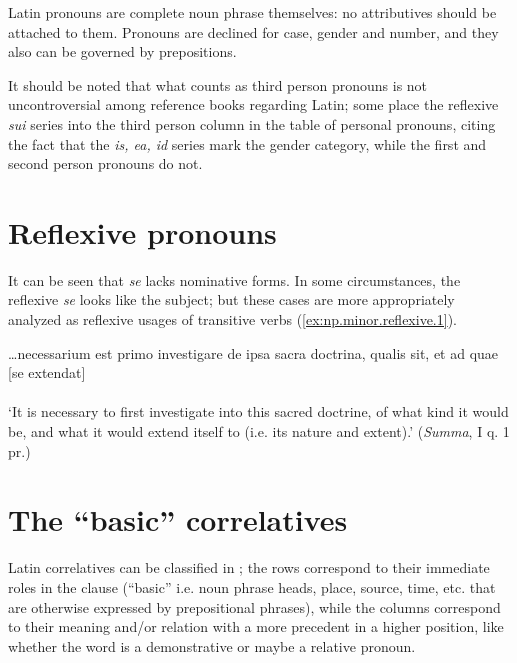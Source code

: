 \documentclass[a4paper, oneside, 12pt]{report}
\newcommand{\form}[1]{\emph{#1}}
\newcommand{\translate}[1]{`#1'}
\newcommand{\literature}[1]{\textit{#1}}
\begin{document}
Latin pronouns are complete noun phrase themselves:
no attributives should be attached to them. 
Pronouns are declined for case, gender and number,
and they also can be governed by prepositions.

It should be noted that what counts as third person pronouns 
is not uncontroversial among reference books regarding Latin; 
some place the reflexive \form{sui} series into the third person column 
in the table of personal pronouns, 
citing the fact that the \form{is, ea, id} series mark the gender category, 
while the first and second person pronouns do not.


\section{Reflexive pronouns}

It can be seen that \form{se} lacks nominative forms.
In some circumstances, 
the reflexive \form{se} looks like the subject;
but these cases are more appropriately analyzed 
as reflexive usages of transitive verbs
(\ref{ex:np.minor.reflexive.1}).

\begin{exe}
    \ex\label{ex:np.minor.reflexive.1} \gll \dots necessarium est primo investigare de ipsa sacra doctrina, 
    qualis sit, et ad quae [se extendat]  \\
    \\
    \glt \translate{It is necessary to first investigate into this sacred doctrine, 
    of what kind it would be, 
    and what it would extend itself to (i.e. its nature and extent).} (\literature{Summa}, I q. 1 pr.)
\end{exe}

\section{The ``basic'' correlatives}

Latin correlatives can be classified in ;
the rows correspond to their immediate roles in the clause 
(``basic'' i.e. noun phrase heads, 
place, source, time, etc. that are otherwise expressed by prepositional phrases),
while the columns correspond to their meaning and/or 
relation with a more precedent in a higher position,
like whether the word is a demonstrative 
or maybe a relative pronoun. 

\begin{table}
    \centering
    \caption{Classification of Latin correlatives}
    \label{tbl:correlatives}
    {\small }
\end{table}
\end{document}
